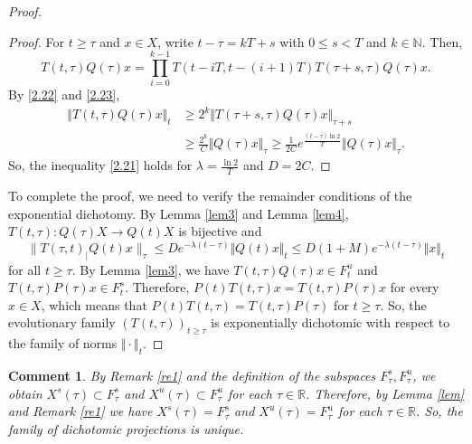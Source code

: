 \documentclass[reqno]{amsart}
\newtheorem{commen}{Comment}[section]
\def\r{\mathbb{R}}
\begin{document}
\begin{proof}
\begin{proof}
For $t \geq \tau$ and $x\in X$, write $t-\tau =kT+s$ with $0 \leq s <T$ and $k\in \mathbb{N}$. Then,
$$T(t,\tau)Q(\tau)x=\prod_{i=0}^{k-1} T(t -iT, t-(i+1)T)T(\tau+s,\tau)Q(\tau) x.$$
By \eqref{2.22} and \eqref{2.23},
 \begin{align*}
 \Vert T(t,\tau)Q(\tau)x \Vert _t  &\geq 2^k \Vert T(\tau +s,\tau)Q(\tau)x\Vert _{\tau+s}\\
 & \geq \frac{2^k}{C}\Vert Q(\tau)x\Vert _{\tau}
 \geq \frac{1}{2C}e^{\frac{(t-\tau) \ln 2}{T}}\Vert Q(\tau)x\Vert _{\tau}.
 \end{align*}
So, the inequality \eqref{2.21} holds for $\lambda =\frac{\ln 2}{T}$ and $D=2C$.
\end{proof}

To complete the proof, we need to verify the remainder conditions of the exponential dichotomy.
By Lemma \ref{lem3} and Lemma \ref{lem4}, $T(t,\tau): Q(\tau)X \to Q(t)X$ is bijective and
$$ \|T(\tau,t)_|Q(t)x\|_{\tau} \le {D} e^{-\lambda(t-\tau)}\Vert Q(t)x\Vert _t \le D(1+M)e^{-\lambda(t-\tau)}\Vert x\Vert _t$$
for all $t\ge \tau$. By Lemma \ref{lem3}, 
we have $T(t,\tau)Q(\tau)x\in F^u_{t}$ and $T(t,\tau)P(\tau)x\in F^s_{t}$. Therefore,
$P(t)T(t,\tau)x=T(t,\tau)P(\tau)x$ for every $x\in X$, which means that $P(t)T(t,\tau)=T(t,\tau)P(\tau)$ for $t\ge \tau$. So, the evolutionary family $(T(t,\tau))_{t \geq \tau}$ is exponentially dichotomic with respect to the family of norms $\Vert \cdot\Vert _t$.
\end{proof}
\begin{commen}\label{re2}
By Remark \ref{re1} and the definition of the subspaces $F^s_{\tau}, F^{u}_{\tau}$, we obtain $X^s(\tau)\subset F^s_{\tau}$ and $X^u(\tau)\subset F^u_{\tau}$ for each $\tau \in \r$. Therefore, by Lemma \ref{lem} and  Remark \ref{re1} we have $X^s(\tau) = F^s_{\tau}$ and $X^u(\tau) = F^u_{\tau}$ for each $\tau \in \r$. So, the family of dichotomic projections is unique.
\end{commen}
\end{document}
